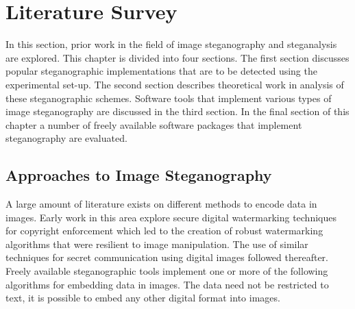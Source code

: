 \chapter{Literature Survey}
\label{ch:litsurvey}
In this section, prior work in the field of image steganography and steganalysis are explored. This chapter is divided into four sections. The first section discusses popular steganographic implementations that are to be detected using the experimental set-up. The second section describes theoretical work in analysis of these steganographic schemes. Software tools that implement various types of image steganography are discussed in the third section. In the final section of this chapter a number of freely available software packages that implement steganography are evaluated.
\section{Approaches to Image Steganography}
\label{sec:overview}
A large amount of literature exists on different methods to encode data in images. Early work in this area explore secure digital watermarking techniques for copyright enforcement which led to the creation of robust watermarking algorithms that were resilient to image manipulation. The use of similar techniques for secret communication using digital images followed thereafter. Freely available steganographic tools implement one or more of the following algorithms for embedding data in images. The data need not be restricted to text, it is possible to embed any other digital format into images. 
